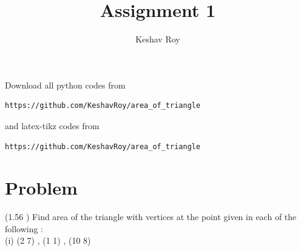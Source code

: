 \documentclass[journal,12pt,twocolumn]{IEEEtran}
\begin{document}
     \def\rightbox#1{\makebox[0in][r]{#1}}
     \def\centbox#1{\makebox[0in]{#1}}
     \def\topbox#1{\raisebox{-\baselineskip}[0in][0in]{#1}}
     \def\midbox#1{\raisebox{-0.5\baselineskip}[0in][0in]{#1}}
\vspace{3cm}
\title{Assignment 1}
\author{Keshav Roy}
\maketitle
\newpage
\bigskip
\renewcommand{\thefigure}{\theenumi}
\renewcommand{\thetable}{\theenumi}
Download all python codes from 
\begin{lstlisting}
https://github.com/KeshavRoy/area_of_triangle
\end{lstlisting}
%
and latex-tikz codes from 
%
\begin{lstlisting}
https://github.com/KeshavRoy/area_of_triangle
\end{lstlisting}
\section{Problem}
(1.56 ) Find area of the triangle with vertices at the point given in each of the following :\\
(i) (2 7) , (1 1) , (10 8)
\end{document}

